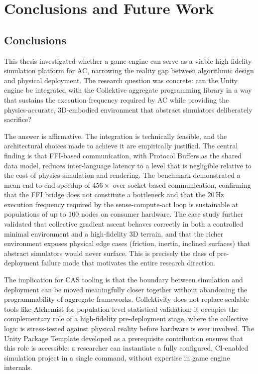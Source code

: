 \chapter{Conclusions and Future Work}

\section{Conclusions}

This thesis investigated whether a game engine can serve as a viable high-fidelity simulation platform for \ac{AC}, narrowing the reality gap between algorithmic design and physical deployment. The research question was concrete: can the Unity engine be integrated with the Collektive aggregate programming library in a way that sustains the execution frequency required by \ac{AC} while providing the physics-accurate, 3D-embodied environment that abstract simulators deliberately sacrifice?

The answer is affirmative. The integration is technically feasible, and the architectural choices made to achieve it are empirically justified. The central finding is that \ac{FFI}-based communication, with Protocol Buffers as the shared data model, reduces inter-language latency to a level that is negligible relative to the cost of physics simulation and rendering. The benchmark demonstrated a mean end-to-end speedup of $456\times$ over socket-based communication, confirming that the \ac{FFI} bridge does not constitute a bottleneck and that the $20\,\text{Hz}$ execution frequency required by the sense-compute-act loop is sustainable at populations of up to 100 nodes on consumer hardware. The case study further validated that collective gradient ascent behaves correctly in both a controlled minimal environment and a high-fidelity 3D terrain, and that the richer environment exposes physical edge cases (friction, inertia, inclined surfaces) that abstract simulators would never surface. This is precisely the class of pre-deployment failure mode that motivates the entire research direction.

The implication for \ac{CAS} tooling is that the boundary between simulation and deployment can be moved meaningfully closer together without abandoning the programmability of aggregate frameworks. Collektivity does not replace scalable tools like Alchemist for population-level statistical validation; it occupies the complementary role of a high-fidelity pre-deployment stage, where the collective logic is stress-tested against physical reality before hardware is ever involved. The Unity Package Template developed as a prerequisite contribution ensures that this role is accessible: a researcher can instantiate a fully configured, CI-enabled simulation project in a single command, without expertise in game engine internals.


